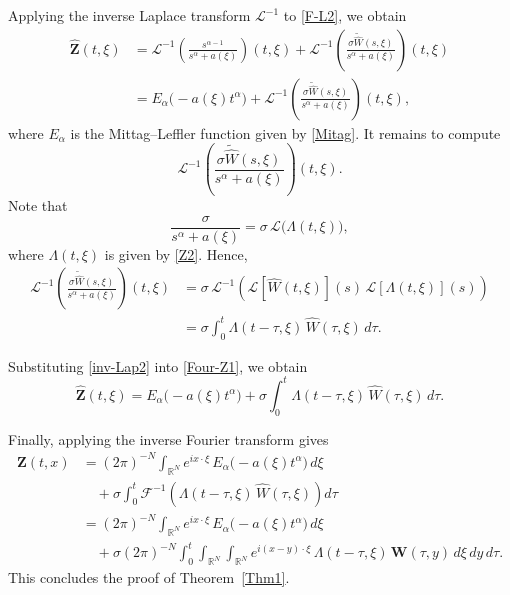 \documentclass[12pt, reqno]{amsart}
\newcommand{\R}{\ensuremath{\mathbb{R}}}
\newcommand{\bz}{\ensuremath{\mathbf{Z}}}
\newcommand{\bw}{\ensuremath{\mathbf{W}}}
\begin{document}
Applying the inverse Laplace transform $\mathcal{L}^{-1}$ to \eqref{F-L2}, we obtain
\begin{equation}\label{Four-Z1}
\begin{split}
\hat{\bz}(t, \xi) 
&= \mathcal{L}^{-1}\!\left( \frac{s^{\alpha-1}}{s^{\alpha} + a(\xi)} \right)(t, \xi) 
+ \mathcal{L}^{-1}\!\left( \frac{\sigma \tilde{\hat{W}}(s, \xi)}{s^{\alpha} + a(\xi)} \right)(t, \xi) \\
&= E_{\alpha}\!\bigl(-a(\xi) t^{\alpha}\bigr) 
+ \mathcal{L}^{-1}\!\left( \frac{\sigma \tilde{\hat{W}}(s, \xi)}{s^{\alpha} + a(\xi)} \right)(t, \xi),
\end{split}
\end{equation}
where $E_{\alpha}$ is the Mittag--Leffler function given by \eqref{Mitag}.
It remains to compute 
$$\mathcal{L}^{-1}\!\left(\frac{\sigma \tilde{\hat{W}}(s, \xi)}{s^{\alpha} + a(\xi)} \right)(t, \xi).$$
Note that
\begin{equation}\label{inv-Lap1}
\frac{\sigma}{s^{\alpha} + a(\xi)} = \sigma \,\mathcal{L}\bigl(\Lambda(t,\xi)\bigr),
\end{equation}
where $\Lambda(t,\xi)$ is given by \eqref{Z2}. Hence,
\begin{equation}\label{inv-Lap2}
\begin{split}
\mathcal{L}^{-1}\!\left(\frac{\sigma \tilde{\hat{W}}(s, \xi)}{s^{\alpha} + a(\xi)} \right)(t, \xi) 
&= \sigma\, \mathcal{L}^{-1}\!\left(\mathcal{L}[\hat{W}(t,\xi)](s)\,\mathcal{L}[\Lambda(t,\xi)](s)\right) \\
&= \sigma \int_0^t \Lambda(t-\tau,\xi)\,\hat{W}(\tau,\xi)\,d\tau.
\end{split}
\end{equation}

Substituting \eqref{inv-Lap2} into \eqref{Four-Z1}, we obtain
\begin{equation}\label{Four-Z2}
\hat{\bz}(t, \xi) 
= E_{\alpha}\!\bigl(-a(\xi) t^{\alpha}\bigr) 
+ \sigma \int_0^t \Lambda(t-\tau,\xi)\,\hat{W}(\tau,\xi)\,d\tau.
\end{equation}

Finally, applying the inverse Fourier transform gives
\begin{equation}\label{Inv-Four}
\begin{split}
\bz(t,x) 
&= (2\pi)^{-N} \int_{\R^N} e^{i x\cdot \xi}\, E_{\alpha}\!\bigl(-a(\xi) t^\alpha\bigr)\, d\xi \\
&\quad + \sigma \int_0^t \mathcal{F}^{-1}\!\left( \Lambda(t-\tau, \xi)\, \hat{W}(\tau,\xi) \right) d\tau \\
&= (2\pi)^{-N} \int_{\R^N} e^{i x\cdot \xi}\, E_{\alpha}\!\bigl(-a(\xi) t^\alpha\bigr)\, d\xi \\
&\quad + \sigma (2\pi)^{-N} \int_0^t \int_{\R^N}\int_{\R^N} e^{i(x-y)\cdot \xi}\, \Lambda(t-\tau, \xi)\, \bw(\tau, y)\, d\xi\,dy\,d\tau.
\end{split}
\end{equation}
This concludes the proof of Theorem~\ref{Thm1}.
\end{document}
